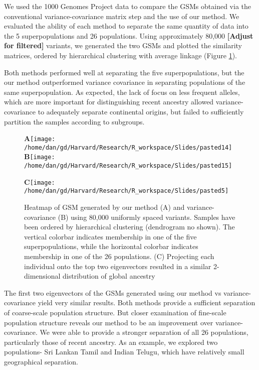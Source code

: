 \documentclass[english]{article}
\begin{document}
We used the 1000 Genomes Project data to compare the GSMs obtained
via the conventional variance-covariance matrix step and the use of
our method. We evaluated the ability of each method to separate the
same quantity of data into the 5 superpopulations and 26 populations.
Using approximately 80,000\textbf{ {[}Adjust for filtered{]}} variants,
we generated the two GSMs and plotted the similarity matrices, ordered
by hierarchical clustering with average linkage (Figure \ref{fig:heatmaps}).

Both methods performed well at separating the five superpopulations,
but the our method outperformed variance covariance in separating
populations of the same superpopulation. As expected, the lack of
focus on less frequent alleles, which are more important for distinguishing
recent ancestry allowed variance-covariance to adequately separate
continental origins, but failed to sufficiently partition the samples
according to subgroups.

\begin{figure}
\textbf{A}\texttt{[image: /home/dan/gd/Harvard/Research/R\_workspace/Slides/pasted14]}\textbf{B}\texttt{[image: /home/dan/gd/Harvard/Research/R\_workspace/Slides/pasted15]}

\textbf{C}\texttt{[image: /home/dan/gd/Harvard/Research/R\_workspace/Slides/pasted5]}\caption{Heatmap of GSM generated by our method (A) and variance-covariance
(B) using 80,000 uniformly spaced variants. Samples have been ordered
by hierarchical clustering (dendrogram no shown). The vertical colorbar
indicates membership in one of the five superpopulations, while the
horizontal colorbar indicates membership in one of the 26 populations.
(C) Projecting each individual onto the top two eigenvectors resulted
in a similar 2-dimensional distribution of global ancestry}
\label{fig:heatmaps}
\end{figure}


The first two eigenvectors of the GSMs generated using our method
vs variance-covariance yield very similar results. Both methods provide
a sufficient separation of coarse-scale population structure. But
closer examination of fine-scale population structure reveals our
method to be an improvement over variance-covariance. We were able
to provide a stronger separation of all 26 populations, particularly
those of recent ancestry. As an example, we explored two populations-
Sri Lankan Tamil and Indian Telugu, which have relatively small geographical
separation.
\end{document}
